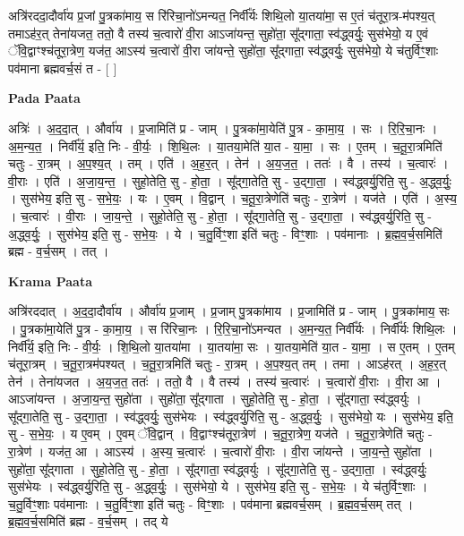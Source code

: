 \documentclass[17pt]{extarticle}
\begin{document}
अत्रि॑रददा॒दौर्वा॑य प्र॒जां पु॒त्रका॑माय॒ स रि॑रिचा॒नो॑ऽमन्यत॒ निर्वी᳚र्यः शिथि॒लो या॒तया॑मा॒ स ए॒तं च॑तूरा॒त्र-म॑पश्य॒त् तमाऽह॑र॒त् तेना॑यजत॒ ततो॒ वै तस्य॑ च॒त्वारो॑ वी॒रा आऽजा॑यन्त॒ सुहो॑ता॒ सू᳚द्गाता॒ स्व॑द्ध्वर्युः॒ सुस॑भेयो॒ य ए॒वं ॅवि॒द्वाꣳश्च॑तूरा॒त्रेण॒ यज॑त॒ आऽस्य॑ च॒त्वारो॑ वी॒रा जा॑यन्ते॒ सुहो॑ता॒ सू᳚द्गाता॒ स्व॑द्ध्वर्युः॒ सुस॑भेयो॒ ये च॑तुर्विꣳ॒॒शाः पव॑माना ब्रह्मवर्च॒सं त - [  ] \newline

\textbf{Pada Paata} \newline

अत्रिः॑ । अ॒द॒दा॒त् । और्वा॑य । प्र॒जामिति॑ प्र - जाम् । पु॒त्रका॑मा॒येति॑ पु॒त्र - का॒मा॒य॒ । सः । रि॒रि॒चा॒नः । अ॒म॒न्य॒त॒ । निर्वी᳚र्य॒ इति॒ निः - वी॒र्यः॒ । शि॒थि॒लः । या॒तया॒मेति॑ या॒त - या॒मा॒ । सः । ए॒तम् । च॒तू॒रा॒त्रमिति॑ चतुः - रा॒त्रम् । अ॒प॒श्य॒त् । तम् । एति॑ । अ॒ह॒र॒त् । तेन॑ । अ॒य॒ज॒त॒ । ततः॑ । वै । तस्य॑ । च॒त्वारः॑ । वी॒राः । एति॑ । अ॒जा॒य॒न्त॒ । सुहो॒तेति॒ सु - हो॒ता॒ । सू᳚द्गा॒तेति॒ सु - उ॒द्गा॒ता॒ । स्व॑द्ध्वर्यु॒रिति॒ सु - अ॒द्ध्व॒र्युः॒ । सुस॑भेय॒ इति॒ सु - स॒भे॒यः॒ । यः । ए॒वम् । वि॒द्वान् । च॒तू॒रा॒त्रेणेति॑ चतुः - रा॒त्रेण॑ । यज॑ते । एति॑ । अ॒स्य॒ । च॒त्वारः॑ । वी॒राः । जा॒य॒न्ते॒ । सुहो॒तेति॒ सु - हो॒ता॒ । सू᳚द्गा॒तेति॒ सु - उ॒द्गा॒ता॒ । स्व॑द्ध्वर्यु॒रिति॒ सु - अ॒द्ध्व॒र्युः॒ । सुस॑भेय॒ इति॒ सु - स॒भे॒यः॒ । ये । च॒तु॒र्विꣳ॒॒शा इति॑ चतुः - विꣳ॒॒शाः । पव॑मानाः । ब्र॒ह्म॒व॒र्च॒समिति॑ ब्रह्म - व॒र्च॒सम् । तत् ।  \newline


\textbf{Krama Paata} \newline

अत्रि॑रददात् । अ॒द॒दा॒दौर्वा॑य । और्वा॑य प्र॒जाम् । प्र॒जाम् पु॒त्रका॑माय । प्र॒जामिति॑ प्र - जाम् । पु॒त्रका॑माय॒ सः । पु॒त्रका॑मा॒येति॑ पु॒त्र - का॒मा॒य॒ । स रि॑रिचा॒नः । रि॒रि॒चा॒नो॑ऽमन्यत । अ॒म॒न्य॒त॒ निर्वी᳚र्यः । निर्वी᳚र्यः शिथि॒लः । निर्वी᳚र्य॒ इति॒ निः - वी॒र्यः॒ । शि॒थि॒लो या॒तया॑मा । या॒तया॑मा॒ सः । या॒तया॒मेति॑ या॒त - या॒मा॒ । स ए॒तम् । ए॒तम् च॑तूरा॒त्रम् । च॒तू॒रा॒त्रम॑पश्यत् । च॒तू॒रा॒त्रमिति॑ चतुः - रा॒त्रम् । अ॒प॒श्य॒त् तम् । तमा । आऽह॑रत् । अ॒ह॒र॒त् तेन॑ । तेना॑यजत । अ॒य॒ज॒त॒ ततः॑ । ततो॒ वै । वै तस्य॑ । तस्य॑ च॒त्वारः॑ । च॒त्वारो॑ वी॒राः । वी॒रा आ । आऽजा॑यन्त । अ॒जा॒य॒न्त॒ सुहो॑ता । सुहो॑ता॒ सू᳚द्‍गाता । सुहो॒तेति॒ सु - हो॒ता॒ । सू᳚द्‍गाता॒ स्व॑द्ध्वर्युः । सू᳚द्‍गा॒तेति॒ सु - उ॒द्‍गा॒ता॒ । स्व॑द्ध्वर्युः॒ सुस॑भेयः । स्व॑द्ध्वर्यु॒रिति॒ सु - अ॒द्ध्व॒र्युः॒ । सुस॑भेयो॒ यः । सुस॑भेय॒ इति॒ सु - स॒भे॒यः॒ । य ए॒वम् । ए॒वम् ॅवि॒द्वान् । वि॒द्वाꣳश्च॑तूरा॒त्रेण॑ । च॒तू॒रा॒त्रेण॒ यज॑ते । च॒तू॒रा॒त्रेणेति॑ चतुः - रा॒त्रेण॑ । यज॑त॒ आ । आऽस्य॑ । अ॒स्य॒ च॒त्वारः॑ । च॒त्वारो॑ वी॒राः । वी॒रा जा॑यन्ते । जा॒य॒न्ते॒ सुहो॑ता । सुहो॑ता॒ सू᳚द्‍गाता । सुहो॒तेति॒ सु - हो॒ता॒ । सू᳚द्‍गाता॒ स्व॑द्ध्वर्युः । सू᳚द्‍गा॒तेति॒ सु - उ॒द्‍गा॒ता॒ । स्व॑द्ध्वर्युः॒ सुस॑भेयः । स्व॑द्ध्वर्यु॒रिति॒ सु - अ॒द्ध्व॒र्युः॒ । सुस॑भेयो॒ ये । सुस॑भेय॒ इति॒ सु - स॒भे॒यः॒ । ये च॑तुर्विꣳ॒॒शाः । च॒तु॒र्विꣳ॒॒शाः पव॑मानाः । च॒तु॒र्विꣳ॒॒शा इति॑ चतुः - विꣳ॒॒शाः । पव॑माना ब्रह्मवर्च॒सम् । ब्र॒ह्म॒व॒र्च॒सम् तत् । ब्र॒ह्म॒व॒र्च॒समिति॑ ब्रह्म - व॒र्च॒सम् । तद् ये \newline
\end{document}
